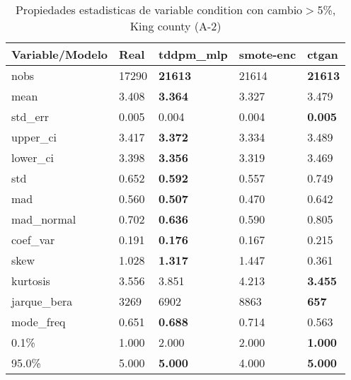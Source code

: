 \begin{table}[H]
\centering
\fontsize{8}{14}\selectfont
\caption{Propiedades estadisticas de variable condition con cambio\ensuremath{>}5\%, King county (A-2)}
\label{table-stats-king county-a-2-condition-short}
\begin{tabular}{|l|m{10em}|m{10em}|m{10em}|m{10em}|}
\hline
 \rowcolor[gray]{0.8}
Variable/Modelo & Real & tddpm\_mlp & smote-enc & ctgan \\
\hline nobs & 17290 & \bfseries 21613 & \cellcolor[rgb]{0.9, 0.54, 0.52} 21614 & \bfseries 21613 \\
\hline mean & 3.408 & \bfseries 3.364 & \cellcolor[rgb]{0.9, 0.54, 0.52} 3.327 & 3.479 \\
\hline std\_err & 0.005 & 0.004 & \cellcolor[rgb]{0.9, 0.54, 0.52} 0.004 & \bfseries 0.005 \\
\hline upper\_ci & 3.417 & \bfseries 3.372 & \cellcolor[rgb]{0.9, 0.54, 0.52} 3.334 & 3.489 \\
\hline lower\_ci & 3.398 & \bfseries 3.356 & \cellcolor[rgb]{0.9, 0.54, 0.52} 3.319 & 3.469 \\
\hline std & 0.652 & \bfseries 0.592 & 0.557 & \cellcolor[rgb]{0.9, 0.54, 0.52} 0.749 \\
\hline mad & 0.560 & \bfseries 0.507 & \cellcolor[rgb]{0.9, 0.54, 0.52} 0.470 & 0.642 \\
\hline mad\_normal & 0.702 & \bfseries 0.636 & \cellcolor[rgb]{0.9, 0.54, 0.52} 0.590 & 0.805 \\
\hline coef\_var & 0.191 & \bfseries 0.176 & 0.167 & \cellcolor[rgb]{0.9, 0.54, 0.52} 0.215 \\
\hline skew & 1.028 & \bfseries 1.317 & 1.447 & \cellcolor[rgb]{0.9, 0.54, 0.52} 0.361 \\
\hline kurtosis & 3.556 & 3.851 & \cellcolor[rgb]{0.9, 0.54, 0.52} 4.213 & \bfseries 3.455 \\
\hline jarque\_bera & 3269 & 6902 & \cellcolor[rgb]{0.9, 0.54, 0.52} 8863 & \bfseries 657 \\
\hline mode\_freq & 0.651 & \bfseries 0.688 & 0.714 & \cellcolor[rgb]{0.9, 0.54, 0.52} 0.563 \\
\hline 0.1\% & 1.000 & \cellcolor[rgb]{0.9, 0.54, 0.52} 2.000 & \cellcolor[rgb]{0.9, 0.54, 0.52} 2.000 & \bfseries 1.000 \\
\hline 95.0\% & 5.000 & \bfseries 5.000 & \cellcolor[rgb]{0.9, 0.54, 0.52} 4.000 & \bfseries 5.000 \\
\hline
\end{tabular}
\end{table}
